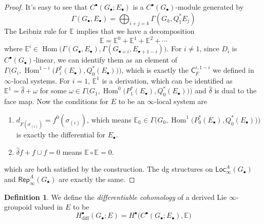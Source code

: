 \documentclass[12pt]{amsart}
\theoremstyle{definition}
\newtheorem{defn}[thm]{Definition}
\theoremstyle{remark}
\numberwithin{equation}{section}
\newcommand{\CC}{{\mathsf C}}
\newcommand{\BE}{{\mathbb E}}
\newcommand{\1}{{\mathbb{1}}}
\newcommand{\diff}{\operatorname{diff}}
\newcommand{\rep}{\mathsf{Rep}}
\newcommand{\Loc}{\mathsf{Loc}}
\newcommand{\bt}{\bullet}
\newcommand{\Hom}{\operatorname{Hom}}
\begin{document}
\begin{proof}
    It's easy to see that $C^{\bt}(G_{\bt}; E_{\bt})$ is a $C^{\bt}(G_{\bt})$-module generated by $$\Gamma(G_{\bt}, E_{\bt}) = \bigoplus_{i+j = k} \Gamma(G_{k}, Q_1^* E_{j})$$
    The Leibniz rule for $\BE$ implies that we have a decomposition
    \begin{equation*}
        \BE = \BE^0+\BE^1 + \BE^2 +\cdots 
    \end{equation*}
    where $\BE^i \in  \Hom\big(\Gamma(G_{\bt}, E_{\bt}), \Gamma(G_{\bt+i}, E_{\bt+ 1-i})\big)$. For $i\not=1$, since $D_i$ is $C^{\bt}(G_{\bt})$-linear, we can identify them as an element of $\Gamma\Big(G_i, \Hom^{1-i}\big(P^*_i(E_{\bt}), Q^*_0(E_{\bt})\big)\Big)$, which  is exactly the $\CC^{i,1-i}_F$ we defined in $\infty$-local systems. For $i=1$, $\BE^1$ is a derivation, which can be identified as $\BE^1 = \hat{\delta} + \omega$ for some $\omega \in \Gamma\Big(G_1, \Hom^{0}\big(P^*_1(E_{\bt}), Q^*_0(E_{\bt})\big)\Big)$ and $\hat{\delta}$ is dual to the face map. Now the conditions for $E$ to be an  $\infty$-local system are
    \begin{enumerate}
        \item  $d_{F(\sigma_{(i)})} = f^0(\sigma_{(i)})$, which means $\mathbb{E_0}\in \Gamma\Big(G_0, \Hom^{1}\big(P^*_0(E_{\bt}), Q^*_0(E_{\bt})\big)\Big)$ is exactly the differential for $E_{\bt}$.\\
        \item $\hat{\delta} f + f\cup f = 0$ means $\BE\circ \BE = 0$.
    \end{enumerate}
    which are both satisfied by the construction. The dg structures on $\Loc_{\infty}^{A}(G_{\bt})$ and $\rep^A_{\infty}(G_{\bt})$ are exactly the same.
\end{proof}

\begin{defn}
    We define the {\it differentiable cohomology} of a derived Lie $\infty$-groupoid valued in $E$ to be
    \begin{equation*}
        H^{\bt}_{\diff}(G_{\bt}; E) = H^{\bt}\big(C^{\bt}(G_{\bt}; E_{\bt}), \BE \big)
    \end{equation*}
\end{defn}



\end{document}
